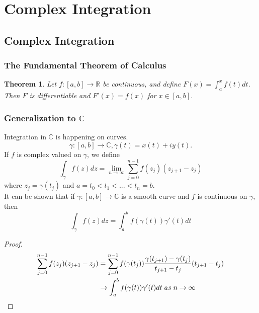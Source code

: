 \documentclass{article}
\newtheorem{theorem}{Theorem}[section]
\begin{document}
\section{Complex Integration}
\subsection{Complex Integration}
\subsubsection{The Fundamental Theorem of Calculus}
\begin{theorem}
Let $f : [a, b] \to \mathbb{R}$ be continuous, and define $F(x) = \int_a^x f(t)dt$. Then $F$ is differentiable and $F'(x) = f(x)$ for $x \in [a, b]$.
\end{theorem}

\subsubsection{Generalization to $\mathbb{C}$}
Integration in $\mathbb{C}$ is happening on curves.
\begin{equation*}
\gamma : [a, b] \to \mathbb{C}, \gamma (t) = x(t) + iy(t).
\end{equation*}
If $f$ is complex valued on $\gamma$, we define
\begin{equation*}
\int_{\gamma} f(z)dz = \lim_{n\to \infty} \sum_{j=0}^{n-1}f(z_j)(z_{j+1} - z_j)
\end{equation*}
where $z_j = \gamma (t_j)$ and $a = t_0 < t_1 < ... < t_n = b$. \\
It can be shown that if $\gamma : [a, b] \to \mathbb{C}$ is a smooth curve and $f$ is continuous on $\gamma$, then
\begin{equation*}
\int_{\gamma} f(z)dz = \int_a^b f(\gamma (t))\gamma '(t)dt
\end{equation*}
\begin{proof}
\begin{align*}
\sum_{j=0}^{n-1} f(z_j)(z_{j+1} - z_j) &= \sum_{j=0}^{n-1}f(\gamma (t_j))\frac{\gamma (t_{j+1}) - \gamma (t_j)}{t_{j+1} - t_j}(t_{j+1} - t_j) \\
&\to \int_a^b f(\gamma (t))\gamma '(t)dt \hspace{0.1cm} as \hspace{0.1cm} n \to \infty
\end{align*}
\end{proof}
\end{document}
